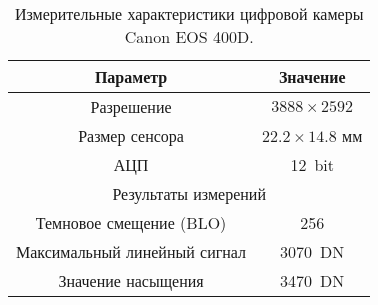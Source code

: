 \documentclass[a4paper,14pt,russian]{extreport}
\begin{document}




\begin{table}[H]
\caption{\label{tab:canonsummary}Измерительные характеристики цифровой камеры Canon EOS 400D.}
\begin{center}
\begin{tabular}{|c|c|}
\hline
Параметр & Значение \\
\hline
Разрешение & $3888 \times 2592$ \\
Размер сенсора & $22.2 \times 14.8$ мм \\
АЦП & 12~bit\\
\hline
\multicolumn{2}{|c|}{Результаты измерений} \\
\hline
Темновое смещение (BLO) & 256 \\
Максимальный линейный сигнал & 3070~DN \\
Значение насыщения & 3470~DN \\
\hline
\end{tabular}
\end{center}
\end{table} 



\end{document}
